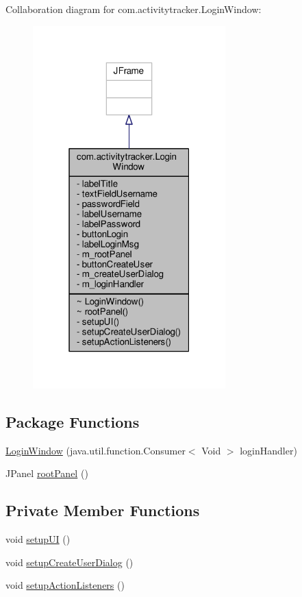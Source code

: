 Collaboration diagram for com.\+activitytracker.\+Login\+Window\+:
\nopagebreak
\begin{figure}[H]
\begin{center}
\leavevmode
\includegraphics[width=211pt]{classcom_1_1activitytracker_1_1_login_window__coll__graph}
\end{center}
\end{figure}
\subsection*{Package Functions}
\begin{DoxyCompactItemize}
\item 
\hyperlink{classcom_1_1activitytracker_1_1_login_window_a137cce127ffa1660c70d3fddbc0e2a74}{Login\+Window} (java.\+util.\+function.\+Consumer$<$ Void $>$ login\+Handler)
\item 
J\+Panel \hyperlink{classcom_1_1activitytracker_1_1_login_window_ab1ea45e86bbb79bccd06531279f1e443}{root\+Panel} ()
\end{DoxyCompactItemize}
\subsection*{Private Member Functions}
\begin{DoxyCompactItemize}
\item 
void \hyperlink{classcom_1_1activitytracker_1_1_login_window_a7af9edf52b3028437e2159f0be9893a9}{setup\+UI} ()
\item 
void \hyperlink{classcom_1_1activitytracker_1_1_login_window_a567db7b15448fe9d9c76addbcee4092b}{setup\+Create\+User\+Dialog} ()
\item 
void \hyperlink{classcom_1_1activitytracker_1_1_login_window_af1ff236b841c51bfb49e143344a3c3ac}{setup\+Action\+Listeners} ()
\end{DoxyCompactItemize}
